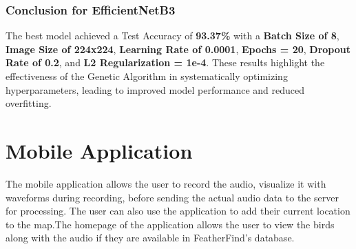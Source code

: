  
  
\subsubsection{Conclusion for EfficientNetB3}
The best model achieved a Test Accuracy of \textbf{93.37\%} with a \textbf{Batch Size of 8}, \textbf{Image Size of 224x224}, \textbf{Learning Rate of 0.0001}, \textbf{Epochs = 20}, \textbf{Dropout Rate of 0.2}, and \textbf{L2 Regularization = 1e-4}. These results highlight the effectiveness of the Genetic Algorithm in systematically optimizing hyperparameters, leading to improved model performance and reduced overfitting.

\section{Mobile Application}
The mobile application allows the user to record the audio, visualize it with
waveforms during recording, before sending the actual audio data to the server
for processing. The user can also use the application to add their current
location to the map.The homepage of the application allows the user to view the birds along with 
the audio if they are available in FeatherFind's database.
